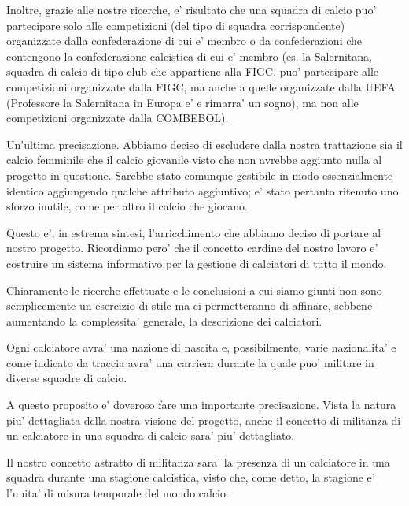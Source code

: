 Inoltre, grazie alle nostre ricerche, e' risultato che una squadra di calcio puo' partecipare
solo alle competizioni (del tipo di squadra corrispondente) organizzate dalla confederazione
di cui e' membro o da confederazioni che contengono la confederazione calcistica di cui
e' membro (es. la Salernitana, squadra di calcio di tipo club che appartiene alla FIGC,
puo' partecipare alle competizioni organizzate dalla FIGC, ma anche a quelle organizzate
dalla UEFA (Professore la Salernitana in Europa e' e rimarra' un sogno),
ma non alle competizioni organizzate dalla COMBEBOL).

Un'ultima precisazione. Abbiamo deciso di escludere dalla nostra trattazione sia il calcio
femminile che il calcio giovanile visto che non avrebbe aggiunto nulla al progetto in questione.
Sarebbe stato comunque gestibile in modo essenzialmente identico aggiungendo qualche attributo
aggiuntivo; e' stato pertanto ritenuto uno sforzo inutile, come per altro il calcio che giocano.
\bigskip
\bigskip

Questo e', in estrema sintesi, l'arricchimento che abbiamo deciso di portare al nostro progetto.
Ricordiamo pero' che il concetto cardine del nostro lavoro e' costruire un sistema informativo
per la gestione di calciatori di tutto il mondo.

Chiaramente le ricerche effettuate e le conclusioni a cui siamo giunti non sono semplicemente
un esercizio di stile ma ci permetteranno di affinare, sebbene aumentando la complessita'
generale, la descrizione dei calciatori.

\bigskip
\bigskip

Ogni calciatore avra' una nazione di nascita e, possibilmente, varie nazionalita' e
come indicato da traccia avra' una carriera durante la quale puo' militare in diverse
squadre di calcio.

A questo proposito e' doveroso fare una importante precisazione. Vista la natura piu' dettagliata
della nostra visione del progetto, anche il concetto di militanza di un calciatore in una squadra
di calcio sara' piu' dettagliato.

Il nostro concetto astratto di militanza sara' la presenza di un calciatore in una squadra
durante una stagione calcistica, visto che, come detto, la stagione e' l'unita' di misura
temporale del mondo calcio.

